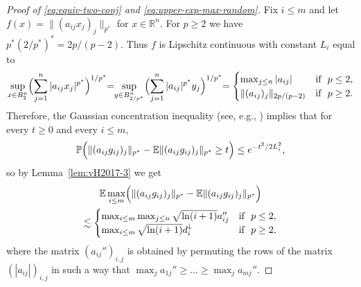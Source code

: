 \documentclass[a4paper]{amsart}
\theoremstyle{definition}
\theoremstyle{remark}
\numberwithin{equation}{section}
\newcommand*{\RR}{\mathbb{R}}
\newcommand*{\EE}{\mathbb{E}}
\newcommand*{\PP}{\mathbb{P}}
\newcommand*{\rearr}{\downarrow} %
\begin{document}
\begin{proof}[Proof of \eqref{eq:equiv-two-conj} and \eqref{eq:upper-exp-max-random}]
	Fix $i\le m$ and let $f(x)=\|(a_{ij}x_j)_j\|_{p^\ast}$ for $x\in \RR^n$. For $p\ge 2$ we have $p^\ast (2/p^\ast)^\ast = 2p/(p-2)$. Thus $f$ is Lipschitz continuous with constant $L_i$ equal to
	\[
			\sup_{x\in B_2^n} \Bigl(\sum_{j=1}^n |a_{ij}x_{j}|^{p^\ast}\Bigr)^{1/p^\ast} 
		\hspace{-3pt}  = \hspace{-3pt} \sup_{y\in B_{2/p^\ast}^n} \Bigl(\sum_{j=1}^n |a_{ij}|^{p^\ast} y_{j} \Bigr)^{1/p^\ast}
		\hspace{-3pt}  =\begin{cases}
 \max_{j\le n} |a_{ij}| &  \text{if }\  p\leq 2,\\
   \|(a_{ij})_j\|_{{2p/(p-2)}} &   \text{if } \ p\ge 2.
\end{cases} 
	\]
	Therefore, the Gaussian concentration inequality (see, e.g., \cite[Chapter~5.1]{Ledoux}) implies that for every $t\ge 0$ and every $i\le m$,
	\[
		\PP \Bigl(\|(a_{ij}g_{ij})_j\|_{p^\ast}  - \EE \|(a_{ij}g_{ij})_j\|_{p^\ast}  \ge t \Bigr) \le e^{-t^2/2L_i^2},
	\]
	so by Lemma~\ref{lem:vH2017-3} we get
	\begin{multline}\label{eq:help-5.10-1}
	\EE \max_{i\le m}\Bigl(\|(a_{ij}g_{ij})_j\|_{p^\ast}   - \EE \|(a_{ij}g_{ij})_j\|_{p^\ast} \Bigr) 
	\\
	\lesssim 
	\begin{cases}
\max_{i\le m} \max_{j\le n}   \sqrt{\ln(i+1)} a_{ij}'' &  \text{if }\  p\leq 2,\\
  \max_{i\le m} \sqrt{\ln(i+1)}d_i^{\rearr{}} &   \text{if } \ p\ge 2,
   \end{cases} 
	\end{multline}
	where  the matrix  $(a_{ij}'')_{i,j}$ is obtained by permuting the rows of the matrix $(|a_{ij}|)_{i,j}$ in such a way that $\max_j a_{1j}'' \ge \dots \ge \max_j a_{mj}''$. 
 

\end{proof}
\end{document}
